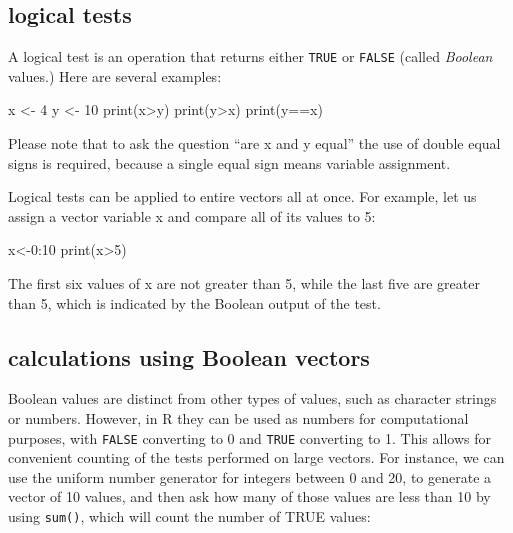 \documentclass[
  letterpaper,
  DIV=11,
  numbers=noendperiod]{scrreprt}
\newenvironment{Shaded}{\begin{snugshade}}{\end{snugshade}}
\newcommand{\NormalTok}[1]{\textcolor[rgb]{0.00,0.23,0.31}{#1}}
\begin{document}

\hypertarget{logical-tests}{%
\subsection*{logical tests}\label{logical-tests}}

A logical test is an operation that returns either \texttt{TRUE} or
\texttt{FALSE} (called \emph{Boolean} values.) Here are several
examples:

\begin{Shaded}
\begin{Highlighting}[]
\NormalTok{x \textless{}{-} 4}
\NormalTok{y \textless{}{-} 10}
\NormalTok{print(x\textgreater{}y)}
\NormalTok{print(y\textgreater{}x)}
\NormalTok{print(y==x)}
\end{Highlighting}
\end{Shaded}

Please note that to ask the question ``are x and y equal'' the use of
double equal signs is required, because a single equal sign means
variable assignment.

Logical tests can be applied to entire vectors all at once. For example,
let us assign a vector variable x and compare all of its values to 5:

\begin{Shaded}
\begin{Highlighting}[]
\NormalTok{x\textless{}{-}0:10}
\NormalTok{print(x\textgreater{}5)}
\end{Highlighting}
\end{Shaded}

The first six values of x are not greater than 5, while the last five
are greater than 5, which is indicated by the Boolean output of the
test.

\hypertarget{calculations-using-boolean-vectors}{%
\subsection*{calculations using Boolean
vectors}\label{calculations-using-boolean-vectors}}

Boolean values are distinct from other types of values, such as
character strings or numbers. However, in R they can be used as numbers
for computational purposes, with \texttt{FALSE} converting to 0 and
\texttt{TRUE} converting to 1. This allows for convenient counting of
the tests performed on large vectors. For instance, we can use the
uniform number generator for integers between 0 and 20, to generate a
vector of 10 values, and then ask how many of those values are less than
10 by using \texttt{sum()}, which will count the number of TRUE values:
\end{document}
